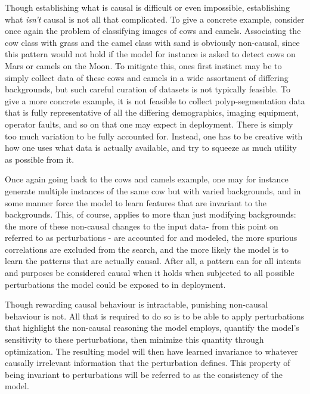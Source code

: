 Though establishing what is causal is difficult or even impossible, establishing what \textit{isn't} causal is not all that complicated. To give a concrete example, consider once again the problem of classifying images of cows and camels. Associating the cow class with grass and the camel class with sand is obviously non-causal, since this pattern would not hold if the model for instance is asked to detect cows on Mars or camels on the Moon. To mitigate this, ones first instinct may be to simply collect data of these cows and camels in a wide assortment of differing backgrounds, but such careful curation of datasets is not typically feasible. To give a more concrete example, it is not feasible to collect polyp-segmentation data that is fully representative of all the differing demographics, imaging equipment, operator faults, and so on that one may expect in deployment. There is simply too much variation to be fully accounted for. Instead, one has to be creative with how one uses what data is actually available, and try to squeeze as much utility as possible from it.

Once again going back to the cows and camels example, one may for instance generate multiple instances of the same cow but with varied backgrounds, and in some manner force the model to learn features that are invariant to the backgrounds. This, of course, applies to more than just modifying backgrounds: the more of these non-causal changes to the input data-  from this point on referred to as perturbations - are accounted for and modeled, the more spurious correlations are excluded from the search, and the more likely the model is to learn the patterns that are actually causal. After all, a pattern can for all intents and purposes be considered causal when it holds when subjected to all possible perturbations the model could be exposed to in deployment. 

Though rewarding causal behaviour is intractable, punishing non-causal behaviour is not. All that is required to do so is to be able to apply perturbations that highlight the non-causal reasoning the model employs, quantify the model's sensitivity to these perturbations, then minimize this quantity through optimization. The resulting model will then have learned invariance to whatever causally irrelevant information that the perturbation defines. This property of being invariant to perturbations will be referred to as the consistency of the model. 


